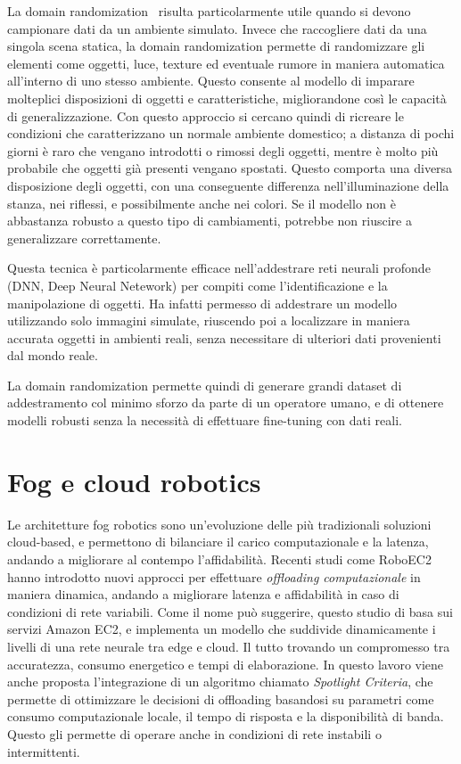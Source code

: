 \documentclass[12pt]{report}
\begin{document}
La domain randomization~\cite{8202133} risulta particolarmente utile quando si devono campionare dati da un ambiente simulato. Invece che raccogliere dati da una singola scena statica, la domain randomization permette di randomizzare gli elementi come oggetti, luce, texture ed eventuale rumore in maniera automatica all'interno di uno stesso ambiente. Questo consente al modello di imparare molteplici disposizioni di oggetti e caratteristiche, migliorandone così le capacità di generalizzazione. Con questo approccio si cercano quindi di ricreare le condizioni che caratterizzano un normale ambiente domestico; a distanza di pochi giorni è raro che vengano introdotti o rimossi degli oggetti, mentre è molto più probabile che oggetti già presenti vengano spostati. Questo comporta una diversa disposizione degli oggetti, con una conseguente differenza nell'illuminazione della stanza, nei riflessi, e possibilmente anche nei colori. Se il modello non è abbastanza robusto a questo tipo di cambiamenti, potrebbe non riuscire a generalizzare correttamente.

Questa tecnica è particolarmente efficace nell'addestrare reti neurali profonde (DNN, Deep Neural Netework) per compiti come l'identificazione e la manipolazione di oggetti. Ha infatti permesso di addestrare un modello utilizzando solo immagini simulate, riuscendo poi a localizzare in maniera accurata oggetti in ambienti reali, senza necessitare di ulteriori dati provenienti dal mondo reale.

La domain randomization permette quindi di generare grandi dataset di addestramento col minimo sforzo da parte di un operatore umano, e di ottenere modelli robusti senza la necessità di effettuare fine-tuning con dati reali.

\section{Fog e cloud robotics}
\label{sec:fog_e_cloud_robotics}

Le architetture fog robotics sono un'evoluzione delle più tradizionali soluzioni cloud-based, e permettono di bilanciare il carico computazionale e la latenza, andando a migliorare al contempo l'affidabilità. Recenti studi come RoboEC2~\cite{10347007} hanno introdotto nuovi approcci per effettuare \textit{offloading computazionale} in maniera dinamica, andando a migliorare latenza e affidabilità in caso di condizioni di rete variabili. Come il nome può suggerire, questo studio di basa sui servizi Amazon EC2, e implementa un modello che suddivide dinamicamente i livelli di una rete neurale tra edge e cloud. Il tutto trovando un compromesso tra accuratezza, consumo energetico e tempi di elaborazione. In questo lavoro viene anche proposta l'integrazione di un algoritmo chiamato \textit{Spotlight Criteria}, che permette di ottimizzare le decisioni di offloading basandosi su parametri come consumo computazionale locale, il tempo di risposta e la disponibilità di banda. Questo gli permette di operare anche in condizioni di rete instabili o intermittenti.
\end{document}
